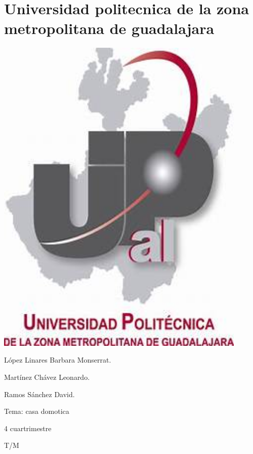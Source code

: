 \documentclass[12pt,a4paper]{article}
\author{leonardo}
\begin{document}
\part{Universidad politecnica de la zona metropolitana de guadalajara }
\includegraphics[width=12cm]{upzmg.jpg}
  \begin{center}
  López Linares Barbara Monserrat.
  \end{center}
  \begin{center}
  Martínez Chávez Leonardo.
  \end{center}
  \begin{center}
  Ramos Sánchez David.
  \end{center}
  \begin{center}
  Tema: casa domotica
 \end{center}
\begin{center}
  4 cuartrimestre
  \end{center}  
  \begin{center}
  T/M
  \end{center}
\end{document}
